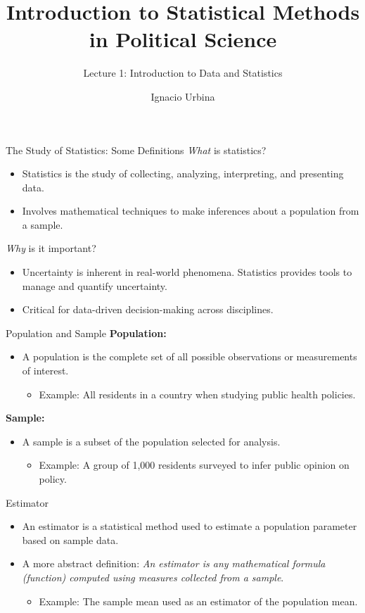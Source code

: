 \documentclass[handout]{beamer} %
\title{Introduction to Statistical Methods in Political Science}
\subtitle{Lecture 1: Introduction to Data and Statistics}
\author{Ignacio Urbina}
\date{}
\begin{document}
\frame{\titlepage}


\begin{frame}{The Study of Statistics: Some Definitions}
\emph{What} is statistics?
    \begin{itemize}
        \item Statistics is the study of collecting, analyzing, interpreting, and presenting data.
        \item Involves mathematical techniques to make inferences about a population from a sample.
    \end{itemize}

\emph{Why} is it important?
    \begin{itemize}
        \item Uncertainty is inherent in real-world phenomena. Statistics provides tools to manage and quantify uncertainty.
        \item Critical for data-driven decision-making across disciplines.
    \end{itemize}
\end{frame}


\begin{frame}{Population and Sample}
\textbf{Population:}
    \begin{itemize}
        \item A population is the complete set of all possible observations or measurements of interest.
            \begin{itemize}
                \item Example: All residents in a country when studying public health policies.
            \end{itemize}
    \end{itemize}
\textbf{Sample:}
    \begin{itemize}
        \item A sample is a subset of the population selected for analysis.
            \begin{itemize}
                \item Example: A group of 1,000 residents surveyed to infer public opinion on policy.
            \end{itemize}
    \end{itemize}
\end{frame}


\begin{frame}{Estimator}
    \begin{itemize}
        \item An estimator is a statistical method used to estimate a population parameter based on sample data.
        \item A more abstract definition: \emph{An estimator is any mathematical formula (function) computed using measures collected from a sample}. 
            \begin{itemize}
                \item Example: The sample mean used as an estimator of the population mean.
            \end{itemize}
    \end{itemize}
\end{frame}
\end{document}
